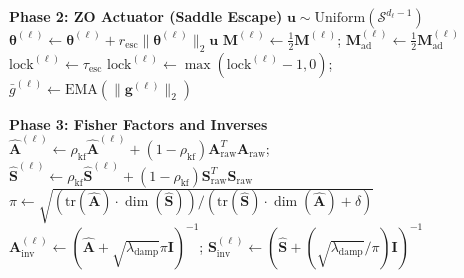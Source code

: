 \documentclass[conference]{IEEEtran}
\begin{document}
\begin{algorithm*}[!t]
\begin{algorithmic}[1]
    \Statex \textbf{Phase 2: ZO Actuator (Saddle Escape)}
            \State $\mathbf{u} \sim \mathrm{Uniform}(\mathcal{S}^{d_\ell - 1})$
            \State $\boldsymbol{\theta}^{(\ell)} \leftarrow \boldsymbol{\theta}^{(\ell)} + r_{\mathrm{esc}} \|\boldsymbol{\theta}^{(\ell)}\|_2 \mathbf{u}$ 
            \State $\mathbf{M}^{(\ell)} \leftarrow \frac{1}{2}\mathbf{M}^{(\ell)}$; $\mathbf{M}_{\mathrm{ad}}^{(\ell)} \leftarrow \frac{1}{2}\mathbf{M}_{\mathrm{ad}}^{(\ell)}$ 
            \State $\mathrm{lock}^{(\ell)} \leftarrow \tau_{\mathrm{esc}}$
        \EndIf
    \EndFor
     $\mathrm{lock}^{(\ell)} \leftarrow \max(\mathrm{lock}^{(\ell)} - 1, 0)$; $\bar{g}^{(\ell)} \leftarrow \mathrm{EMA}(\|\mathbf{g}^{(\ell)}\|_2)$ \EndFor

    \Statex \textbf{Phase 3: Fisher Factors and Inverses}
            \State $\hat{\mathbf{A}}^{(\ell)} \leftarrow \rho_{\mathrm{kf}}\hat{\mathbf{A}}^{(\ell)} + (1-\rho_{\mathrm{kf}})\mathbf{A}_{\mathrm{raw}}^T \mathbf{A}_{\mathrm{raw}}$; $\hat{\mathbf{S}}^{(\ell)} \leftarrow \rho_{\mathrm{kf}}\hat{\mathbf{S}}^{(\ell)} + (1-\rho_{\mathrm{kf}})\mathbf{S}_{\mathrm{raw}}^T \mathbf{S}_{\mathrm{raw}}$
        \EndFor
    \EndIf
            \State $\pi \leftarrow \sqrt{(\mathrm{tr}(\hat{\mathbf{A}}) \cdot \dim(\hat{\mathbf{S}})) / (\mathrm{tr}(\hat{\mathbf{S}}) \cdot \dim(\hat{\mathbf{A}}) + \delta)}$
            \State $\mathbf{A}_{\mathrm{inv}}^{(\ell)} \leftarrow (\hat{\mathbf{A}} + \sqrt{\lambda_{\mathrm{damp}}} \pi \mathbf{I})^{-1}$; $\mathbf{S}_{\mathrm{inv}}^{(\ell)} \leftarrow (\hat{\mathbf{S}} + (\sqrt{\lambda_{\mathrm{damp}}}/\pi) \mathbf{I})^{-1}$
        \EndFor
    \EndIf


\end{algorithmic}
\end{algorithm*}
\end{document}

